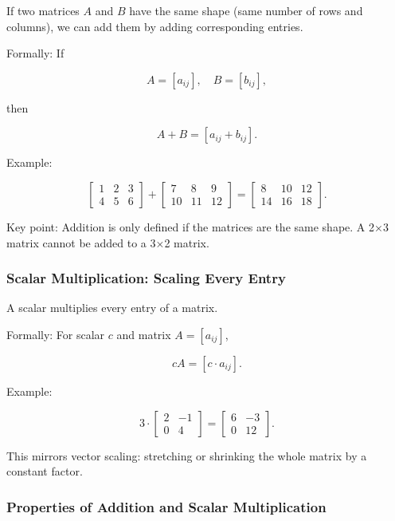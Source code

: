 \documentclass[
  letterpaper,
  DIV=11,
  numbers=noendperiod]{scrreprt}
\begin{document}
If two matrices \(A\) and \(B\) have the same shape (same number of rows
and columns), we can add them by adding corresponding entries.

Formally: If

\[
A = [a_{ij}], \quad B = [b_{ij}],
\]

then

\[
A + B = [a_{ij} + b_{ij}].
\]

Example:

\[
\begin{bmatrix} 
1 & 2 & 3 \\ 
4 & 5 & 6 
\end{bmatrix}
+
\begin{bmatrix} 
7 & 8 & 9 \\ 
10 & 11 & 12 
\end{bmatrix}
=
\begin{bmatrix} 
8 & 10 & 12 \\ 
14 & 16 & 18 
\end{bmatrix}.
\]

Key point: Addition is only defined if the matrices are the same shape.
A 2×3 matrix cannot be added to a 3×2 matrix.

\subsubsection{Scalar Multiplication: Scaling Every
Entry}\label{scalar-multiplication-scaling-every-entry}

A scalar multiplies every entry of a matrix.

Formally: For scalar \(c\) and matrix \(A = [a_{ij}]\),

\[
cA = [c \cdot a_{ij}].
\]

Example:

\[
3 \cdot 
\begin{bmatrix} 
2 & -1 \\ 
0 & 4 
\end{bmatrix}
=
\begin{bmatrix} 
6 & -3 \\ 
0 & 12 
\end{bmatrix}.
\]

This mirrors vector scaling: stretching or shrinking the whole matrix by
a constant factor.

\subsubsection{Properties of Addition and Scalar
Multiplication}\label{properties-of-addition-and-scalar-multiplication}
\end{document}
